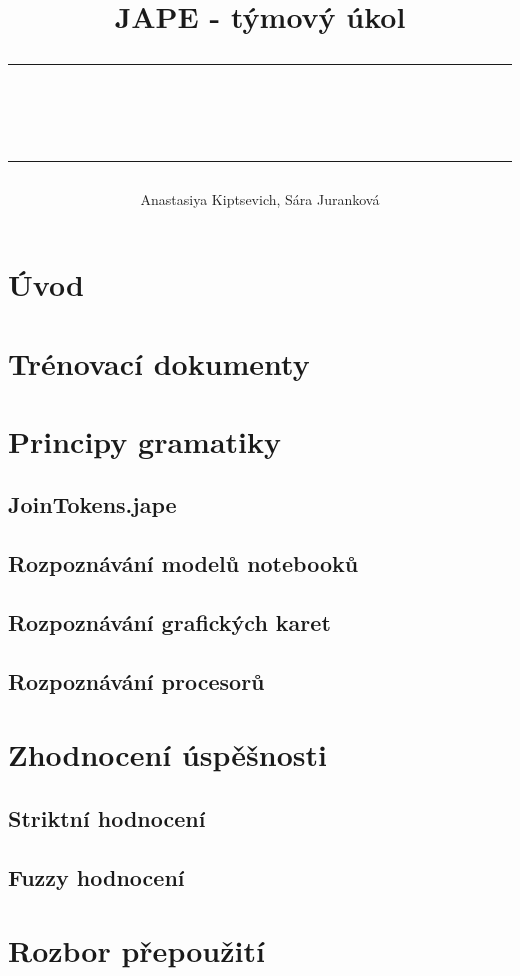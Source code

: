 \documentclass[a4,12pt]{article}
\title{
JAPE - týmový úkol\\
\begin{spacing}{0.1}
\noindent
\rule{\linewidth}{0.3pt}\\\rule{\linewidth}{0.9pt}
\end{spacing}
\rule[75pt]{0pt}{0pt}
}
\author{Anastasiya Kiptsevich, Sára Juranková }
\let\Oldsection\section
\renewcommand{\section}{\FloatBarrier\Oldsection}
\let\Oldsubsection\subsection
\renewcommand{\subsection}{\FloatBarrier\Oldsubsection}
\begin{document}
\maketitle
\newpage
\tableofcontents

\newpage
\section{Úvod}

\section{Trénovací dokumenty}

\section{Principy gramatiky}
\subsection{JoinTokens.jape}
\subsection{Rozpoznávání modelů notebooků}
\subsection{Rozpoznávání grafických karet}
\subsection{Rozpoznávání procesorů}
\section{Zhodnocení úspěšnosti}
\subsection{Striktní hodnocení}
\subsection{Fuzzy hodnocení}
\section{Rozbor přepoužití}
\end{document}

